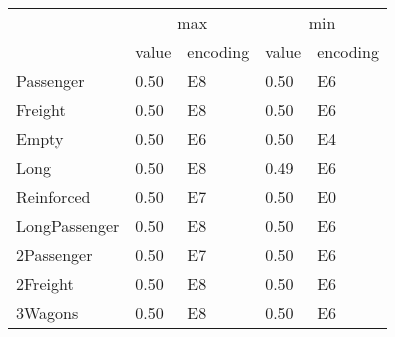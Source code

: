 \begin{tabular}{lllll}
\toprule
 & \multicolumn{2}{c}{max} & \multicolumn{2}{c}{min} \\
 & value & encoding & value & encoding \\
\midrule
Passenger & 0.50 & E8 & 0.50 & E6 \\
Freight & 0.50 & E8 & 0.50 & E6 \\
Empty & 0.50 & E6 & 0.50 & E4 \\
Long & 0.50 & E8 & 0.49 & E6 \\
Reinforced & 0.50 & E7 & 0.50 & E0 \\
LongPassenger & 0.50 & E8 & 0.50 & E6 \\
2Passenger & 0.50 & E7 & 0.50 & E6 \\
2Freight & 0.50 & E8 & 0.50 & E6 \\
3Wagons & 0.50 & E8 & 0.50 & E6 \\
\bottomrule
\end{tabular}

